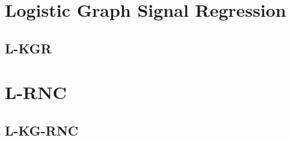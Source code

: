 \section{Logistic Graph Signal Regression} 

\label{sec:logistic_regression}

\subsection{L-KGR}

\label{sec:lkgr}

\section{L-RNC}

\label{sec:lrnc}

\subsection{L-KG-RNC}

\label{sec:lkgrnc}



